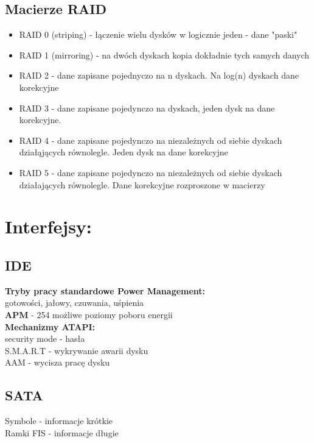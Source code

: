 \documentclass[a4paper]{article}
\begin{document}
\subsection{Macierze RAID}
\begin{itemize}
\item RAID 0 (striping) - łączenie wielu dysków w logicznie jeden - dane "paski"
\item RAID 1 (mirroring) - na dwóch dyskach kopia dokładnie tych samych danych
\item RAID 2 - dane zapisane pojednyczo na n dyskach. Na log(n) dyskach dane korekcyjne
\item RAID 3 - dane zapisane pojedynczo na dyskach, jeden dysk na dane korekcyjne.
\item RAID 4 - dane zapisane pojedynczo na niezależnych od siebie dyskach działąjących równolegle. Jeden dysk na dane korekcyjne
\item RAID 5 - dane zapisane pojedynczo na niezależnych od siebie dyskach działających równolegle. Dane korekcyjne rozproszone w macierzy
\end{itemize}

\newpage
\section{Interfejsy:}
\subsection{IDE}
\textbf{Tryby pracy standardowe Power Management: }\\
gotowości, jałowy, czuwania, uśpienia\\
\textbf{APM} - 254 możliwe poziomy poboru energii\\
\textbf{Mechanizmy ATAPI: }\\
security mode - hasła\\
S.M.A.R.T - wykrywanie awarii dysku\\
AAM - wycisza pracę dysku

\subsection{SATA}
Symbole - informacje krótkie\\
Ramki FIS - informacje długie
\end{document}
